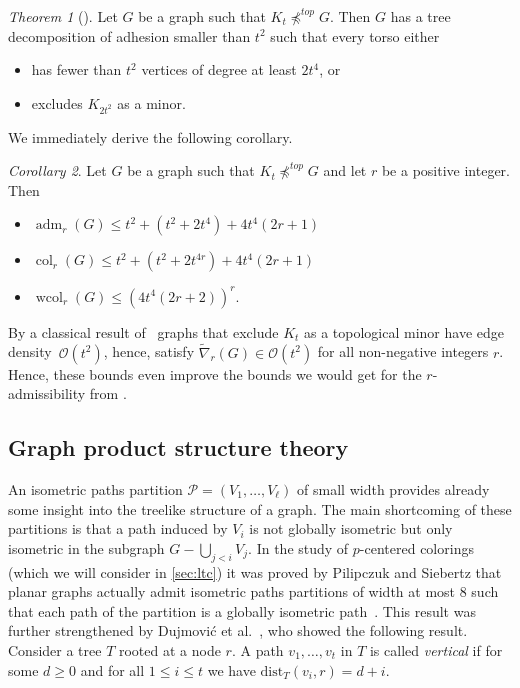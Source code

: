\documentclass[1p,number,a4paper]{elsarticle}
\theoremstyle{remark}
\newcommand{\Oof}{\mathcal{O}}
\newcommand{\Pp}{\mathcal{P}}
\newcommand{\minor}{\preccurlyeq}
\newcommand{\dist}{\mathrm{dist}}
\DeclareMathOperator{\col}{col}
\DeclareMathOperator{\wcol}{wcol}
\DeclareMathOperator{\adm}{adm}
\newtheorem{theorem}{Theorem}[section]
\newtheorem{corollary}[theorem]{Corollary}
\begin{document}
\begin{theorem}[\cite{erde2018short}]
Let $G$ be a graph such that $K_t\not\minor^{top} G$. Then 
$G$ has a tree decomposition of adhesion smaller than $t^2$
such that every torso either
\begin{itemize}
\item has fewer than $t^2$ vertices of degree at least
$2t^4$, or
\item excludes $K_{2t^2}$ as a minor. 
\end{itemize}
\end{theorem}

We immediately derive the following corollary. 

\begin{corollary}
Let $G$ be a graph such that $K_t\not\minor^{top} G$ and 
let $r$ be a positive integer. Then 
\begin{itemize}
\item $\adm_r(G)\leq t^2+(t^2+2t^4)+4t^4(2r+1)$
\item $\col_r(G)\leq t^2+(t^2+2t^{4r})+4t^4(2r+1)$
\item $\wcol_r(G)\leq (4t^4(2r+2))^r$. 
\end{itemize}
\end{corollary}

By a classical result of~\cite{bollobas1998proof,komlos1994topological} graphs that exclude $K_t$ as a topological minor have edge density~$\Oof(t^2)$, hence, satisfy $\widetilde{\nabla}_r(G)\in \Oof(t^2)$ for all non-negative integers $r$. 
Hence, these bounds even improve the bounds we would get for the $r$-admissibility from . 

\subsection{Graph product structure theory}\label{graph-product}

An isometric paths partition $\Pp=(V_1,\ldots, V_\ell)$ of small width provides already some insight into the treelike structure of a graph. 
The main shortcoming of these partitions is that a path induced by $V_i$ is not globally isometric but only isometric in the subgraph $G-\bigcup_{j<i}V_j$. 
In the study of $p$-centered colorings (which we will consider in \cref{sec:ltc}) it was proved by Pilipczuk and Siebertz that planar graphs actually admit isometric paths partitions of width at most $8$ such that each path of the partition is a globally isometric path~\cite{pilipczuk2019polynomial}. 
This result was further strengthened by Dujmovi\'c et al.~\cite{dujmovic2020planar}, who showed the following result. Consider a tree $T$ rooted at a node $r$. A path $v_1,\ldots,v_t$ in $T$ is called \emph{vertical} if for some $d\geq 0$ and for all $1\leq i\leq t$ we have $\dist_T(v_i,r)=d+i$. 
\end{document}
